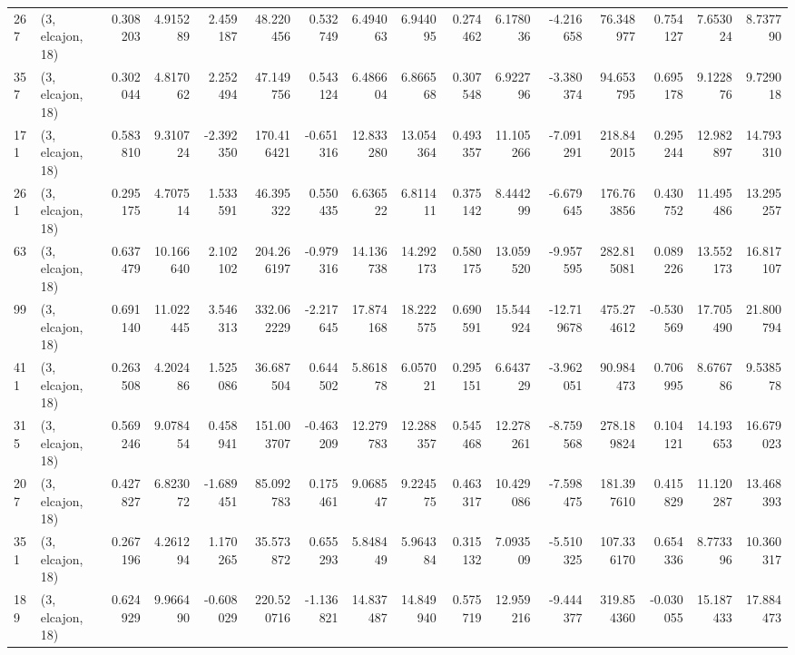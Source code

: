 \begin{tabular}{llrrrrrrrrrrrrrr}
267 &  (3, elcajon, 18) &   0.308203 &   4.915289 &   2.459187 &    48.220456 &   0.532749 &   6.494063 &   6.944095 &  0.274462 &   6.178036 &  -4.216658 &    76.348977 &   0.754127 &   7.653024 &   8.737790 \\
357 &  (3, elcajon, 18) &   0.302044 &   4.817062 &   2.252494 &    47.149756 &   0.543124 &   6.486604 &   6.866568 &  0.307548 &   6.922796 &  -3.380374 &    94.653795 &   0.695178 &   9.122876 &   9.729018 \\
171 &  (3, elcajon, 18) &   0.583810 &   9.310724 &  -2.392350 &   170.416421 &  -0.651316 &  12.833280 &  13.054364 &  0.493357 &  11.105266 &  -7.091291 &   218.842015 &   0.295244 &  12.982897 &  14.793310 \\
261 &  (3, elcajon, 18) &   0.295175 &   4.707514 &   1.533591 &    46.395322 &   0.550435 &   6.636522 &   6.811411 &  0.375142 &   8.444299 &  -6.679645 &   176.763856 &   0.430752 &  11.495486 &  13.295257 \\
63  &  (3, elcajon, 18) &   0.637479 &  10.166640 &   2.102102 &   204.266197 &  -0.979316 &  14.136738 &  14.292173 &  0.580175 &  13.059520 &  -9.957595 &   282.815081 &   0.089226 &  13.552173 &  16.817107 \\
99  &  (3, elcajon, 18) &   0.691140 &  11.022445 &   3.546313 &   332.062229 &  -2.217645 &  17.874168 &  18.222575 &  0.690591 &  15.544924 & -12.719678 &   475.274612 &  -0.530569 &  17.705490 &  21.800794 \\
411 &  (3, elcajon, 18) &   0.263508 &   4.202486 &   1.525086 &    36.687504 &   0.644502 &   5.861878 &   6.057021 &  0.295151 &   6.643729 &  -3.962051 &    90.984473 &   0.706995 &   8.676786 &   9.538578 \\
315 &  (3, elcajon, 18) &   0.569246 &   9.078454 &   0.458941 &   151.003707 &  -0.463209 &  12.279783 &  12.288357 &  0.545468 &  12.278261 &  -8.759568 &   278.189824 &   0.104121 &  14.193653 &  16.679023 \\
207 &  (3, elcajon, 18) &   0.427827 &   6.823072 &  -1.689451 &    85.092783 &   0.175461 &   9.068547 &   9.224575 &  0.463317 &  10.429086 &  -7.598475 &   181.397610 &   0.415829 &  11.120287 &  13.468393 \\
351 &  (3, elcajon, 18) &   0.267196 &   4.261294 &   1.170265 &    35.573872 &   0.655293 &   5.848449 &   5.964384 &  0.315132 &   7.093509 &  -5.510325 &   107.336170 &   0.654336 &   8.773396 &  10.360317 \\
189 &  (3, elcajon, 18) &   0.624929 &   9.966490 &  -0.608029 &   220.520716 &  -1.136821 &  14.837487 &  14.849940 &  0.575719 &  12.959216 &  -9.444377 &   319.854360 &  -0.030055 &  15.187433 &  17.884473 \\

\end{tabular}
